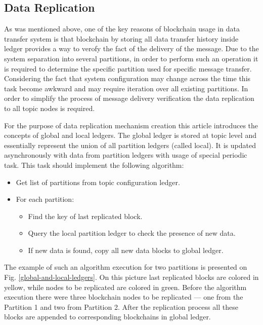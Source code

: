 \documentclass[10pt]{llncs}
\begin{document}
\subsection{Data Replication}\label{data-replication}

As was mentioned above, one of the key reasons of blockchain usage in data transfer system is that blockchain by storing all data transfer history inside ledger
provides a way to verofy the fact of the delivery of the message.
Due to the system separation into several partitions, in order to perform such an operation it is required to determine the specific partition used for specific message transfer.
Considering the fact that system configuration may change across the time this task become awkward and may require iteration over all existing partitions.
In order to simplify the process of message delivery verification the data replication to all topic nodes is required.

For the purpose of data replication mechanism creation this article introduces the concepts of global and local ledgers.
The global ledger is stored at topic level and essentially represent the union of all partition ledgers (called local).
It is updated asynchronously with data from partition ledgers with usage of special periodic task.
This task should implement the following algorithm:

\begin{itemize}
    \item Get list of partitions from topic configuration ledger.
    \item For each partition:
    \begin{itemize}
        \item Find the key of last replicated block.
        \item Query the local partition ledger to check the presence of new data.
        \item If new data is found, copy all new data blocks to global ledger. 
    \end{itemize}
\end{itemize}

The example of such an algorithm execution for two partitions is presented on Fig. \ref{global-and-local-ledgers}.
On this picture last replicated blocks are colored in yellow, while nodes to be replicated are colored in green.
Before the algorithm execution there were three blockchain nodes to be replicated --- one from the Partition 1 and two from Partition 2.
After the replication process all these blocks are appended to corresponding blockchains in global ledger.
\end{document}
